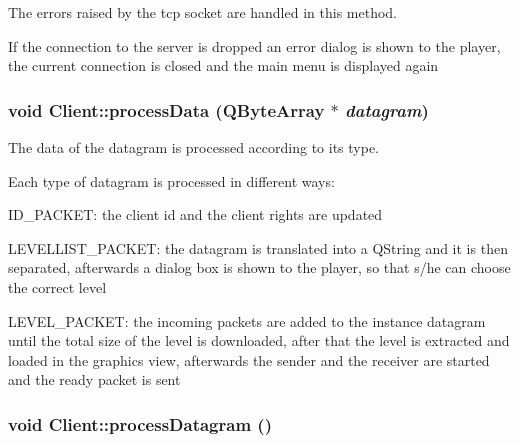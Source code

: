 The errors raised by the tcp socket are handled in this method. 

If the connection to the server is dropped an error dialog is shown to the player, the current connection is closed and the main menu is displayed again \hypertarget{classClient_a449b9867ad67d835ca9cff7cf7262b0a}{
\subsubsection[{processData}]{\setlength{\rightskip}{0pt plus 5cm}void Client::processData (QByteArray $\ast$ {\em datagram})}}
\label{classClient_a449b9867ad67d835ca9cff7cf7262b0a}


The data of the datagram is processed according to its type. 

Each type of datagram is processed in different ways:


\begin{DoxyItemize}
\item ID\_\-PACKET: the client id and the client rights are updated
\end{DoxyItemize}


\begin{DoxyItemize}
\item LEVELLIST\_\-PACKET: the datagram is translated into a QString and it is then separated, afterwards a dialog box is shown to the player, so that s/he can choose the correct level
\end{DoxyItemize}


\begin{DoxyItemize}
\item LEVEL\_\-PACKET: the incoming packets are added to the instance datagram until the total size of the level is downloaded, after that the level is extracted and loaded in the graphics view, afterwards the sender and the receiver are started and the ready packet is sent 
\end{DoxyItemize}\hypertarget{classClient_ac7dd9cf6756896887ab8b684bea35fe8}{
\subsubsection[{processDatagram}]{\setlength{\rightskip}{0pt plus 5cm}void Client::processDatagram ()}}
\label{classClient_ac7dd9cf6756896887ab8b684bea35fe8}


